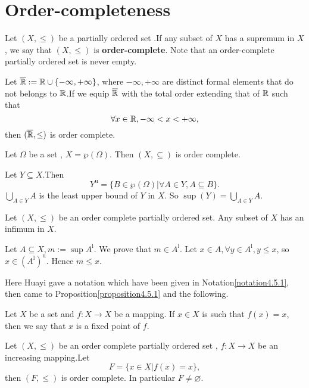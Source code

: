 \documentclass{book}
\numberwithin{equation}{section}
\begin{document}
\section{Order-completeness}
\begin{definitionenv}
    Let $(X, \le)$ be a partially ordered set .If any subset of $X$ has a supremum in $X$,  we say that  $(X,  \le)$ is \textbf{order-complete}. Note that an order-complete
partially ordered set is never empty.
\end{definitionenv}
\begin{axiomenv}
    Let $\overline{\mathbb{R}}:=\mathbb{R}\cup\{-\infty, +\infty\}$,  where $-\infty, +\infty$ are distinct formal elements that do not belongs to $\mathbb{R}$.If we equip $\overline{\mathbb{R}}$ with the total order extending that of $\mathbb{R}$ such that 
    $$\forall x\in \mathbb{R}, -\infty<x<+\infty, $$ 
    then $(\overline{\mathbb{R}}, \le)$ is order complete.
\end{axiomenv}
\begin{exampleenv}
    Let $\Omega$ be a set , $X=\wp(\Omega)$. Then $(X, \subseteq)$ is  order complete.
    \begin{proofenv}
        Let $Y\subseteq X$.Then 
        $$Y^{\mathrm{u}}=\{B\in\wp(\Omega)|\forall A\in Y, A\subseteq B\}.$$
        $\displaystyle \bigcup_{A\in Y}A$ is the least upper bound of $Y$ in $X$. So $\sup (Y)=\bigcup_{A\in Y}A$.
    \end{proofenv}
\end{exampleenv}
\begin{propositionenv}
    Let $(X, \le)$ be an order complete partially ordered set. Any subset of $X$ has an infimum in $X$.
\end{propositionenv}
\begin{proofenv}
    Let $A\subseteq X, m:=\sup A^\mathrm{l}$. We prove that $m\in A^\mathrm{l}$.
    \newline
    Let $x\in A, \forall y \in A^\mathrm{l}, y\le x $,  so $x\in (A^\mathrm{l})^\mathrm{u}$. Hence $m\le x$.
\end{proofenv}
Here Huayi gave a notation which have been given in Notation\ref{notation4.5.1}, then came to Proposition\ref{proposition4.5.1} and the following.
\begin{definitionenv}
    Let $X$ be a set and $f:X\rightarrow X$ be a mapping. If $x\in X $ is such that $f(x)=x$,  then we say that $x$ is a fixed point of $f$. 
\end{definitionenv}
\begin{theoremenv}
    \quad
    \newline
    Let $(X, \le)$ be an order complete partially ordered set , $f:X\rightarrow X$ be an increasing mapping.Let 
    $$F=\{x\in X|f(x)=x\}, $$
    then $(F, \le)$ is order complete. In particular $F\not=\varnothing$.
    
\end{theoremenv}
\end{document}
